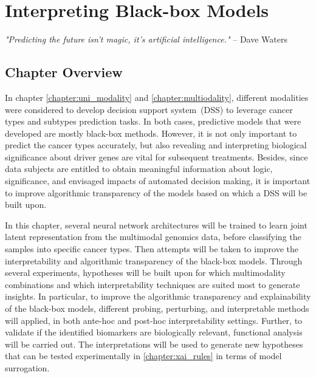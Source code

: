 \chapter{Interpreting Black-box Models}\label{chapter:xai}

\textit{"Predicting the future isn't magic, it's artificial intelligence."} -- Dave Waters 

\section{Chapter Overview}
In chapter \ref{chapter:uni_modality} and \ref{chapter:multiodality}, different modalities were considered to develop decision support system~(DSS) to leverage cancer types and subtypes prediction tasks. In both cases, predictive models that were developed are mostly black-box methods. However, it is not only important to predict the cancer types accurately, but also revealing and interpreting biological significance about driver genes are vital for subsequent treatments. Besides, since data subjects are entitled to obtain meaningful information about logic, significance, and envisaged impacts of automated decision making, it is important to improve algorithmic transparency of the models based on which a DSS will be built upon. 

\hspace*{3.5mm} In this chapter, several neural network architectures will be trained to learn joint latent representation from the multimodal genomics data, before classifying the samples into specific cancer types. Then attempts will be taken to improve the interpretability and algorithmic transparency of the black-box models. Through several experiments, hypotheses will be built upon for which multimodality combinations and which interpretability techniques are suited most to generate insights. In particular, to improve the algorithmic transparency and explainability of the black-box models, different probing, perturbing, and interpretable methods will applied, in both ante-hoc and post-hoc interpretability settings. Further, to validate if the identified biomarkers are biologically relevant, functional analysis will be carried out. The interpretations will be used to generate new hypotheses that can be tested experimentally in \cref{chapter:xai_rules} in terms of model surrogation.

